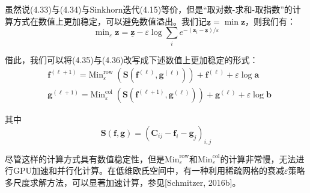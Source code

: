 \documentclass[cn,10pt,math=newtx,citestyle=gb7714-2015,bibstyle=gb7714-2015]{elegantbook}
\begin{document}
\begin{postulate}[对数化Sinkhorn迭代]
虽然说(4.33)与(4.34)与Sinkhorn迭代(4.15)等价，但是“取对数-求和-取指数”的计算方式在数值上更加稳定，可以避免数值溢出。我们记$\underline{\mathbf{z}}=\min \mathbf{z}$，则我们有：
\begin{equation}
    \label{4.37}
    \min\nolimits_\varepsilon \mathbf{z} = \underline{\mathbf{z}} - \varepsilon \log \sum_i e^{-(\mathbf{z}_i-\underline{\mathbf{z}})/\varepsilon}
\end{equation}

借此，我们可以将(4.35)与(4.36)改写成下述数值上更加稳定的形式：
\begin{align}
    \label{4.38}
    & \mathbf{f}^{(\ell+1)} = \text{Min}_\varepsilon^{\text{row}} \;(\mathbf{S}(\mathbf{f}^{(\ell)},\mathbf{g}^{(\ell)})) + \mathbf{f}^{(\ell)} + \varepsilon \log \mathbf{a} \\
    \label{4.39}
    & \mathbf{g}^{(\ell+1)} = \text{Min}_\varepsilon^{\text{col}} \;(\mathbf{S}(\mathbf{f}^{(\ell+1)},\mathbf{g}^{(\ell)})) + \mathbf{g}^{(\ell)} + \varepsilon \log \mathbf{b}
\end{align}

其中
\begin{equation*}
    \mathbf{S}(\mathbf{f},\mathbf{g}) = \left( \mathbf{C}_{ij} - \mathbf{f}_i - \mathbf{g}_j \right)_{i,j}
\end{equation*}

尽管这样的计算方式具有数值稳定性，但是$\text{Min}_\varepsilon^{\text{row}}$和$\text{Min}_\varepsilon^{\text{col}}$的计算非常慢，无法进行GPU加速和并行化计算。在低维欧氏空间中，有一种利用稀疏网格的衰减$\varepsilon$策略多尺度求解方法，可以显著加速计算，参见[Schmitzer, 2016b]。

\end{postulate}
\end{document}
